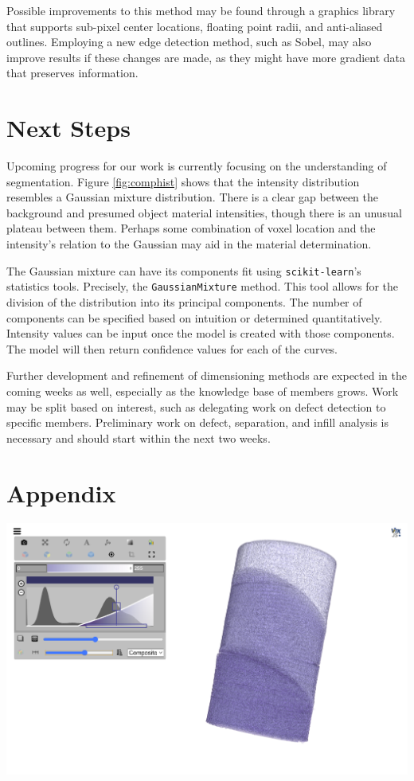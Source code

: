 \documentclass[11pt, letterpaper, notitlepage]{article}
\newenvironment{Figure}
  {\par\medskip\noindent\minipage{\linewidth}}
  {\endminipage\par\medskip}
\begin{document}
\begin{multicols}{2}
Possible improvements to this method may be found through a graphics library that supports sub-pixel center locations, floating point radii, and anti-aliased outlines. Employing a new edge detection method, such as Sobel, may also improve results if these changes are made, as they might have more gradient data that preserves information.

\section{Next Steps}
Upcoming progress for our work is currently focusing on the understanding of segmentation. Figure \ref{fig:comphist} shows that the intensity distribution resembles a Gaussian mixture distribution. There is a clear gap between the background and presumed object material intensities, though there is an unusual plateau between them. Perhaps some combination of voxel location and the intensity's relation to the Gaussian may aid in the material determination. 

The Gaussian mixture can have its components fit using \verb|scikit-learn|'s statistics tools. Precisely, the \verb|GaussianMixture| method. This tool allows for the division of the distribution into its principal components. The number of components can be specified based on intuition or determined quantitatively. Intensity values can be input once the model is created with those components. The model will then return confidence values for each of the curves.

Further development and refinement of dimensioning methods are expected in the coming weeks as well, especially as the knowledge base of members grows. Work may be split based on interest, such as delegating work on defect detection to specific members. Preliminary work on defect, separation, and infill analysis is necessary and should start within the next two weeks.

\printbibliography

\end{multicols}

\section{Appendix}
\begin{Figure}
  \centering
  \includegraphics[width=6in]{images/itk.png}
  \label{fig:itk}
\end{Figure}
\end{document}
